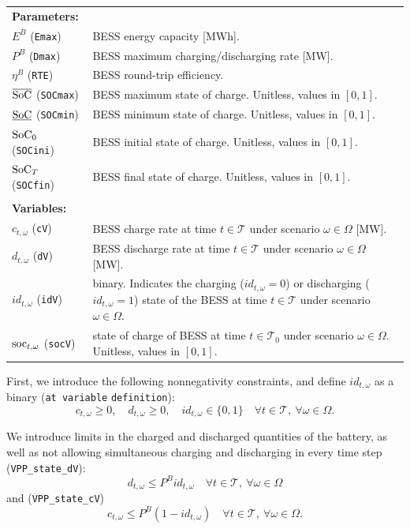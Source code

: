 \begin{tabularx}{\textwidth}{l X}

\textbf{Parameters:} \\
$E^B$ (\texttt{Emax}) & BESS energy capacity [MWh]. \\ 
$P^B$ (\texttt{Dmax}) & BESS maximum charging/discharging rate [MW]. \\ 
$\eta^B$ (\texttt{RTE}) & BESS round-trip efficiency. \\ 
$\overline{\text{SoC}}$ (\texttt{SOCmax}) & BESS maximum state of charge. Unitless, values in $[0, 1]$. \\ 
$\underline{\text{SoC}}$ (\texttt{SOCmin}) & BESS minimum state of charge. Unitless, values in $[0, 1]$. \\ 
$\text{SoC}_0$ (\texttt{SOCini}) & BESS initial state of charge. Unitless, values in $[0, 1]$. \\ 
$\text{SoC}_T$ (\texttt{SOCfin}) & BESS final state of charge. Unitless, values in $[0, 1]$. \\
\\
\textbf{Variables:} \\
$c_{t, \omega}$ (\texttt{cV}) & BESS charge rate at time $t \in \mathcal{T}$ under scenario $\omega \in \Omega$ [MW]. \\ 
$d_{t, \omega}$ (\texttt{dV}) & BESS discharge rate at time $t \in \mathcal{T}$ under scenario $\omega \in \Omega$ [MW]. \\ 
$id_{t, \omega}$ (\texttt{idV}) & binary. Indicates the charging ($id_{t, \omega} = 0$) or discharging ($id_{t, \omega}= 1$) state of the BESS at time $t \in \mathcal{T}$ under scenario $\omega \in \Omega$. \\ 
$\text{soc}_{t, \omega}$ (\texttt{socV}) & state of charge of BESS at time $t \in \mathcal{T}_0$ under scenario $\omega \in \Omega$. Unitless, values in $[0, 1]$. \\
\end{tabularx}

First, we introduce the following nonnegativity  constraints, and define $id_{t, \omega}$ as a binary (\verb|at variable| \verb|definition|):
\begin{equation} \label{dVdCPos}
	c_{t, \omega} \geq 0, \quad d_{t, \omega} \geq 0, \quad id_{t, \omega} \in \{ 0, 1 \} \quad \forall t \in \mathcal{T}, \ \forall \omega \in \Omega.
\end{equation}

We introduce limits in the charged and discharged quantities of the battery, as well as not allowing simultaneous charging and discharging in every time step (\verb|VPP_state_dV|):
\begin{equation} \label{EQ:VPP_state_dV}
	d_{t, \omega} \leq P^B id_{t, \omega} \quad \forall t \in \mathcal{T}, \ \forall \omega \in \Omega
\end{equation}
and (\verb|VPP_state_cV|)
\begin{equation} \label{EQ:VPP_state_cV}
	c_{t, \omega} \leq P^B (1 - id_{t, \omega}) \quad \forall t \in \mathcal{T}, \ \forall \omega \in \Omega.
\end{equation}


